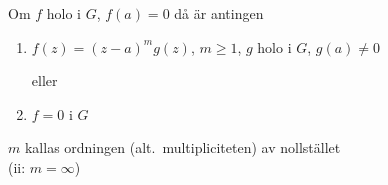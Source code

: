 \begin{theorem}
Om $f$ holo i $G$, $f(a) = 0$ då är antingen
\begin{enumerate}[label=\roman*)]
  \item $f(z) = (z - a)^m g(z)$, $m \ge 1$, $g$ holo i $G$, $g(a) \neq 0$

  eller
  \item $f = 0$ i $G$
\end{enumerate}
$m$ kallas ordningen (alt.\ multipliciteten) av nollstället\\
(ii: $m = \infty$)
\end{theorem}
